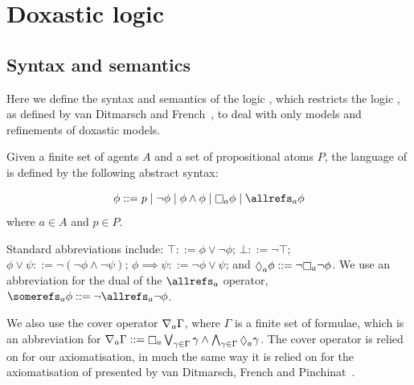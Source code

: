 \chapter{Doxastic logic}\label{chapter-doxastic}

\section{Syntax and semantics}

Here we define the syntax and semantics of the logic \logicKDF{}, which
restricts the logic \logicKF{}, as defined by van Ditmarsch and
French~\cite{french2009simulation}, to deal with only models and refinements of
doxastic models.


\begin{definition} %
Given a finite set of agents $A$ and a set of propositional atoms $P$, the
language of \langF{} is defined by the following abstract syntax:

$$
\phi ::=    p \bnfalt
            \neg \phi \bnfalt
            \phi \land \phi \bnfalt
            \knows_a \phi \bnfalt
            \allrefs_a \phi
$$
where $a \in A$ and $p \in P$.
\end{definition}

Standard abbreviations include:
$\top ::= \phi \lor \neg \phi$;
$\bot ::= \neg \top$;
$\phi \lor \psi ::= \neg (\neg \phi \land \neg \psi)$;
$\phi \implies \psi ::= \neg \phi \lor \psi$;
and $\suspects_a \phi ::= \neg \knows_a \neg \phi$.
We use an abbreviation for the dual of the $\allrefs_a$ operator,
$\somerefs_a \phi ::= \neg \allrefs_a \neg \phi$.

We also use the cover operator $\nabla_a \Gamma$, where $\Gamma$ is a finite
set of formulae, which is an abbreviation for 
$\covers_a \Gamma ::= \knows_a \bigvee_{\gamma \in \Gamma} \gamma \land
\bigwedge_{\gamma \in \Gamma} \suspects_a \gamma$. The cover operator is relied
on for our axiomatisation, in much the same way it is relied on for the
axiomatisation of \logicKiF{} presented by van Ditmarsch, French and
Pinchinat~\cite{french2010future}. %

